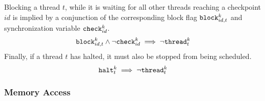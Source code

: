 Blocking a thread $t$, while it is waiting for all other threads reaching a checkpoint $id$ is implied by a conjunction of the corresponding block flag $\texttt{block}^k_{id, t}$ and synchronization variable $\texttt{check}^k_{id}$.
\[
  \texttt{block}^k_{id, t} \land \lnot \texttt{check}^k_{id} \implies \lnot \texttt{thread}^k_t
\]
Finally, if a thread $t$ has halted, it must also be stopped from being scheduled.
\[
  \texttt{halt}^k_t \implies \lnot \texttt{thread}^k_t
\]

\subsubsection*{Memory Access}

\newcommand{\LOAD}{\texttt{load}}

